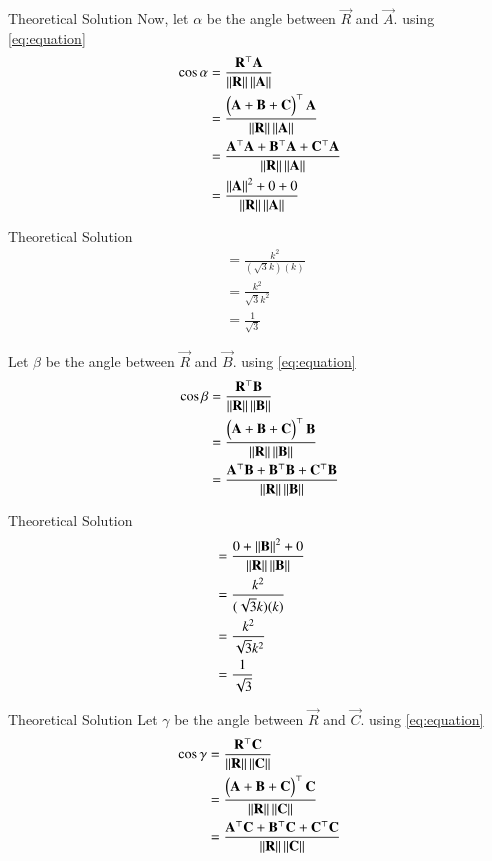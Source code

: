 \documentclass{beamer}
\begin{document}
\begin{frame}{Theoretical Solution}
Now, let $\alpha$ be the angle between $\vec{R}$ and $\vec{A}$. using \eqref{eq:equation}
\begin{align}
\cos \alpha &= \frac{\mathbf{R}^\top \mathbf{A}}{\left\lVert\mathbf{R}\right\rVert \left\lVert\mathbf{A}\right\rVert} \\
&= \frac{\begin{pmatrix}\mathbf{A} + \mathbf{B} + \mathbf{C}\end{pmatrix}^\top \mathbf{A}}{\left\lVert\mathbf{R}\right\rVert \left\lVert\mathbf{A}\right\rVert}   \\
&= \frac{\mathbf{A}^\top \mathbf{A} + \mathbf{B}^\top \mathbf{A} + \mathbf{C}^\top \mathbf{A}}{\left\lVert\mathbf{R}\right\rVert \left\lVert\mathbf{A}\right\rVert}   \\
&= \frac{\left\lVert\mathbf{A}\right\rVert^2 + 0 + 0}{\left\lVert\mathbf{R}\right\rVert \left\lVert\mathbf{A}\right\rVert}  
\end{align}
\end{frame}

\begin{frame}{Theoretical Solution}
\begin{align}
&= \frac{k^2}{(\sqrt{3}k)(k)}  \\
&= \frac{k^2}{\sqrt{3}k^2}  \\
&= \frac{1}{\sqrt{3}}
\end{align}

Let $\beta$ be the angle between $\vec{R}$ and $\vec{B}$. using \eqref{eq:equation}
\begin{align}
\cos \beta &= \frac{\mathbf{R}^\top \mathbf{B}}{\left\lVert\mathbf{R}\right\rVert \left\lVert\mathbf{B}\right\rVert}  \\
&= \frac{\begin{pmatrix}\mathbf{A} + \mathbf{B} + \mathbf{C}\end{pmatrix}^\top \mathbf{B}}{\left\lVert\mathbf{R}\right\rVert \left\lVert\mathbf{B}\right\rVert}   \\
&= \frac{\mathbf{A}^\top \mathbf{B} + \mathbf{B}^\top \mathbf{B} + \mathbf{C}^\top \mathbf{B}}{\left\lVert\mathbf{R}\right\rVert \left\lVert\mathbf{B}\right\rVert} 
\end{align}
\end{frame}

\begin{frame}{Theoretical Solution}
\begin{align}
&= \frac{0 + \left\lVert\mathbf{B}\right\rVert^2 + 0}{\left\lVert\mathbf{R}\right\rVert \left\lVert\mathbf{B}\right\rVert}   \\
&= \frac{k^2}{(\sqrt{3}k)(k)}   \\
&= \frac{k^2}{\sqrt{3}k^2}   \\
&= \frac{1}{\sqrt{3}}
\end{align}
\end{frame}

\begin{frame}{Theoretical Solution}
Let $\gamma$ be the angle between $\vec{R}$ and $\vec{C}$. using \eqref{eq:equation}
\begin{align}
\cos \gamma &= \frac{\mathbf{R}^\top \mathbf{C}}{\left\lVert\mathbf{R}\right\rVert \left\lVert\mathbf{C}\right\rVert}\\
&= \frac{\begin{pmatrix}\mathbf{A} + \mathbf{B} + \mathbf{C}\end{pmatrix}^\top \mathbf{C}}{\left\lVert\mathbf{R}\right\rVert \left\lVert\mathbf{C}\right\rVert}   \\
&= \frac{\mathbf{A}^\top \mathbf{C} + \mathbf{B}^\top \mathbf{C} + \mathbf{C}^\top \mathbf{C}}{\left\lVert\mathbf{R}\right\rVert \left\lVert\mathbf{C}\right\rVert}  
\end{align}
\end{frame}
\end{document}
